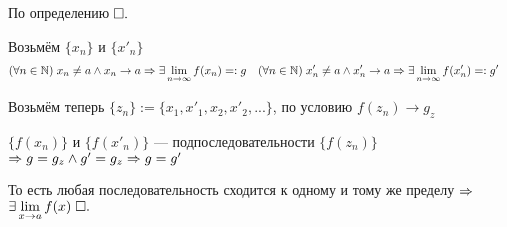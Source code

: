 \documentclass{article}
\begin{document}
По определению$\qed$

\enough

Возьмём $\{x_{n}\}$ и $\{x'_{n}\}$
\begin{align*}
	 & (\forall n\in\N)\;x_{n}\neq a\land x_{n}\to a \Rarr\exists\slimty f(x_{n})=:g &  & (\forall n\in\N)\;x'_{n}\neq a\land x'_{n}\to a\Rarr\exists\slimty f(x'_{n})=:g'
\end{align*}

Возьмём теперь $\{z_{n}\}:=\{x_1,x'_{1},x_2,x'_{2},...\}$, по условию $f(z_{n})\to g_{z}$

$\{f(x_{n})\}$ и $\{f(x'_{n})\}$ --- подпоследовательности $\{f(z_{n})\}$ $\Rarr g=g_{z}\land g'=g_{z}\Rarr g=g'$

То есть любая последовательность сходится к одному и тому же пределу $\Rarr$ $\exists\slim{x\to a}f(x)\qed$
\end{document}
